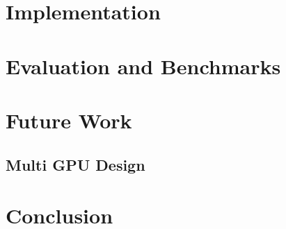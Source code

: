 \documentclass{article}
\begin{document}
\section{Implementation}

\section{Evaluation and Benchmarks}

\section{Future Work}
\subsection{Multi GPU Design}

\section{Conclusion}









\end{document}
